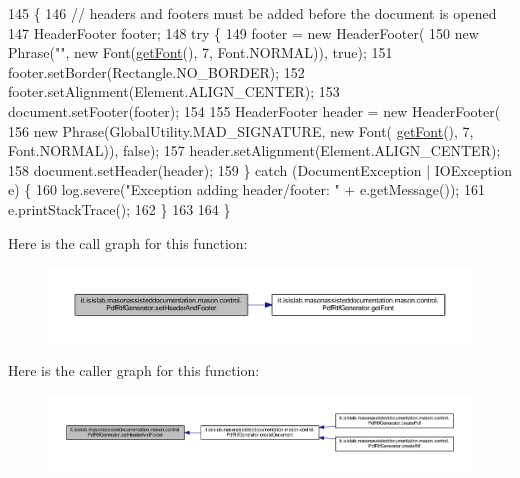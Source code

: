 \begin{DoxyCode}
145                                                        \{
146         \textcolor{comment}{// headers and footers must be added before the document is opened}
147         HeaderFooter footer;
148         \textcolor{keywordflow}{try} \{
149             footer = \textcolor{keyword}{new} HeaderFooter(
150                         \textcolor{keyword}{new} Phrase(\textcolor{stringliteral}{""}, \textcolor{keyword}{new} Font(\hyperlink{classit_1_1isislab_1_1masonassisteddocumentation_1_1mason_1_1control_1_1_pdf_rtf_generator_ae256fb15c0845470ad900c876a15fabf}{getFont}(), 7, Font.NORMAL)), \textcolor{keyword}{true});
151             footer.setBorder(Rectangle.NO\_BORDER);
152                         footer.setAlignment(Element.ALIGN\_CENTER);
153                         document.setFooter(footer);
154 
155                         HeaderFooter header = \textcolor{keyword}{new} HeaderFooter(
156                                     \textcolor{keyword}{new} Phrase(GlobalUtility.MAD\_SIGNATURE, \textcolor{keyword}{new} Font(
      \hyperlink{classit_1_1isislab_1_1masonassisteddocumentation_1_1mason_1_1control_1_1_pdf_rtf_generator_ae256fb15c0845470ad900c876a15fabf}{getFont}(), 7, Font.NORMAL)), \textcolor{keyword}{false});
157                         header.setAlignment(Element.ALIGN\_CENTER);
158                         document.setHeader(header);
159         \} \textcolor{keywordflow}{catch} (DocumentException | IOException e) \{
160             log.severe(\textcolor{stringliteral}{"Exception adding header/footer: "} + e.getMessage());
161             e.printStackTrace();
162         \}
163         
164     \}
\end{DoxyCode}


Here is the call graph for this function\-:\nopagebreak
\begin{figure}[H]
\begin{center}
\leavevmode
\includegraphics[width=350pt]{classit_1_1isislab_1_1masonassisteddocumentation_1_1mason_1_1control_1_1_pdf_rtf_generator_add96cb1e39ece24ace1e42aae99082a0_cgraph}
\end{center}
\end{figure}




Here is the caller graph for this function\-:\nopagebreak
\begin{figure}[H]
\begin{center}
\leavevmode
\includegraphics[width=350pt]{classit_1_1isislab_1_1masonassisteddocumentation_1_1mason_1_1control_1_1_pdf_rtf_generator_add96cb1e39ece24ace1e42aae99082a0_icgraph}
\end{center}
\end{figure}





